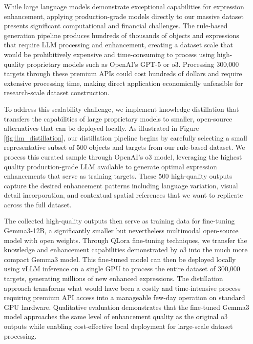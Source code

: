 While large language models demonstrate exceptional capabilities for expression enhancement, applying production-grade models directly to our massive dataset presents significant computational and financial challenges. The rule-based generation pipeline produces hundreds of thousands of objects and expressions that require LLM processing and enhancement, creating a dataset scale that would be prohibitively expensive and time-consuming to process using high-quality proprietary models such as OpenAI's GPT-5 or o3. Processing 300,000 targets through these premium APIs could cost hundreds of dollars and require extensive processing time, making direct application economically unfeasible for research-scale dataset construction.

To address this scalability challenge, we implement knowledge distillation that transfers the capabilities of large proprietary models to smaller, open-source alternatives that can be deployed locally. As illustrated in Figure \ref{fig:llm_distillation}, our distillation pipeline begins by carefully selecting a small representative subset of 500 objects and targets from our rule-based dataset. We process this curated sample through OpenAI's o3 model, leveraging the highest quality production-grade LLM available to generate optimal expression enhancements that serve as training targets. These 500 high-quality outputs capture the desired enhancement patterns including language variation, visual detail incorporation, and contextual spatial references that we want to replicate across the full dataset.

The collected high-quality outputs then serve as training data for fine-tuning Gemma3-12B, a significantly smaller but nevertheless multimodal open-source model with open weights. Through QLora fine-tuning techniques, we transfer the knowledge and enhancement capabilities demonstrated by o3 into the much more compact Gemma3 model. This fine-tuned model can then be deployed locally using vLLM inference on a single GPU to process the entire dataset of 300,000 targets, generating millions of new enhanced expressions. The distillation approach transforms what would have been a costly and time-intensive process requiring premium API access into a manageable few-day operation on standard GPU hardware. Qualitative evaluation demonstrates that the fine-tuned Gemma3 model approaches the same level of enhancement quality as the original o3 outputs while enabling cost-effective local deployment for large-scale dataset processing.

